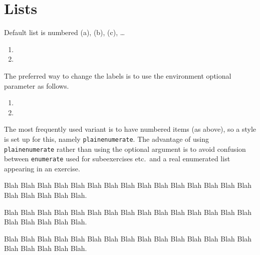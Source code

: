 \documentclass[solutionsatend,twocolumnsolutions]{ouunit}
\begin{document}
\section{Lists}
Default list is numbered (a), (b), (c), \ldots
\begin{enumerate}
\item
\lipsum[133]
\item
\lipsum[133]
\end{enumerate}
The preferred way to change the labels is to use the environment optional parameter as follows.
\begin{enumerate}[1.]
\item
\lipsum[133]
\item
\lipsum[133]
\end{enumerate}
The most frequently used variant is to have numbered items (as above), so a style is set up for this, namely \verb”plainenumerate”. The advantage of using \verb”plainenumerate” rather than using the optional argument is to avoid confusion between \verb”enumerate” used for subeexercises etc.\ and a real enumerated list appearing in an exercise. 
\begin{plainenumerate}
\item Blah Blah Blah Blah Blah Blah Blah Blah Blah Blah Blah Blah Blah Blah Blah Blah Blah Blah Blah Blah.
\item Blah Blah Blah Blah Blah Blah Blah Blah Blah Blah Blah Blah Blah Blah Blah Blah Blah Blah Blah Blah.
\item Blah Blah Blah Blah Blah Blah Blah Blah Blah Blah Blah Blah Blah Blah Blah Blah Blah Blah Blah Blah.
\end{plainenumerate}
\end{document}
